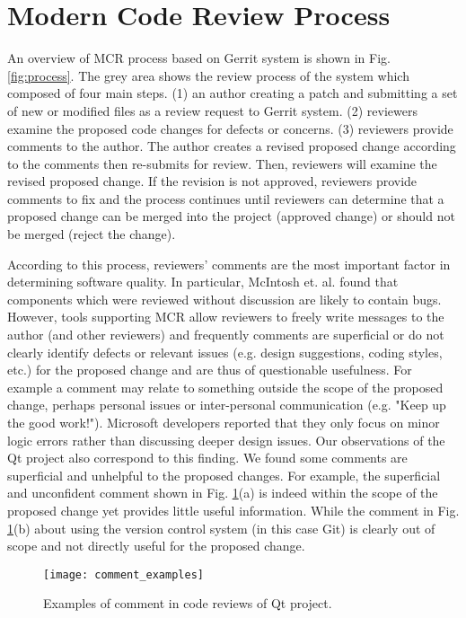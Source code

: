 
\section{Modern Code Review Process}

An overview of MCR process based on Gerrit system is shown in Fig. \ref{fig:process}. The grey area shows the review process of the system which composed of four main steps. (1) an author creating a patch and submitting a set of new or modified files as a review request to Gerrit system. (2) reviewers examine the proposed code changes for defects or concerns. (3) reviewers provide comments to the author. The author creates a revised proposed change according to the comments then re-submits for review. Then, reviewers will examine the revised proposed change. If the revision is not approved, reviewers provide comments to fix and the process continues until reviewers can determine that a proposed change can be merged into the project (approved change) or should not be merged (reject the change). 

According to this process, reviewers' comments are the most important factor in determining software quality. In particular, McIntosh et. al. \cite{Mcintosh} found that components which were reviewed without discussion are likely to contain bugs. However, tools supporting MCR allow reviewers to freely write messages to the author (and other reviewers) and frequently comments are superficial or do not clearly identify defects or relevant issues (e.g. design suggestions, coding styles, etc.) for the proposed change and are thus of questionable usefulness. For example a comment may relate to something outside the scope of the proposed change, perhaps personal issues or inter-personal communication (e.g. "Keep up the good work!"). Microsoft developers reported that they only focus on minor logic errors rather than discussing deeper design\cite{Bacchelli2013a} issues. Our observations of the Qt project also correspond to this finding. We found some comments are superficial and unhelpful to the proposed changes. For example, the superficial and unconfident comment shown in Fig. \ref{fig:example}(a) is indeed within the scope of the proposed change yet provides little useful information. While the comment in Fig. \ref{fig:example}(b) about using the version control system (in this case Git) is clearly out of scope and not directly useful for the proposed change. 

\begin{figure}[!t]
\centering
\texttt{[image: comment\_examples]}
\caption{Examples of comment in code reviews of Qt project.}
\label{fig:example}
\end{figure}

